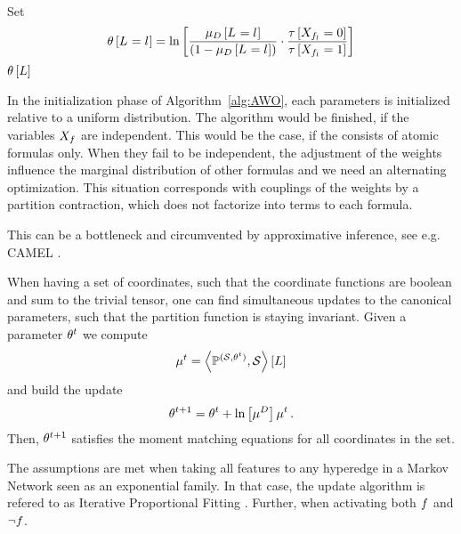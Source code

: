 \begin{algorithm}[hbt!]
\begin{algorithmic}
\begin{align*}
                \end{align*}
                \State Set
                \begin{align*}
                    \theta\left[L_{}=l_{}\right] = \ln \left[ 
                        \frac{\mu_{D}\left[L_{}=l_{}\right]}{(1-\mu_{D}\left[L_{}=l_{}\right])}
                        \cdot \frac{\tau\left[X_{f_{l}}=0\right]}{\tau\left[X_{f_{l}}=1\right]}
                     \right]
                \end{align*}
            \EndFor
        \EndWhile
        \State \Return $\theta\left[L\right]$
    \end{algorithmic}
\end{algorithm}

%


In the initialization phase of Algorithm~\ref{alg:AWO}, each parameters is initialized relative to a uniform distribution.
The algorithm would be finished, if the variables $X_{f}$ are independent.
This would be the case, if the \MarkovLogicNetwork{} consists of atomic formulas only.
When they fail to be independent, the adjustment of the weights influence the marginal distribution of other formulas and we need an alternating optimization.
% 
This situation corresponds with couplings of the weights by a partition contraction, which does not factorize into terms to each formula.


This can be a bottleneck and circumvented by approximative inference, see e.g. CAMEL \cite{ganapathi_constrained_2008}.



\begin{remark}
    When having a set of coordinates, such that the coordinate functions are boolean and sum to the trivial tensor, one can find simultaneous updates to the canonical parameters, such that the partition function is staying invariant.
    Given a parameter $\theta^t$ we compute
    \[ \mu^t = \left\langle \mathbb{P}^{(\mathcal{S},\theta^t)}, \mathcal{S}\right\rangle \left[ L \right] \]
    and build the update
    \[ \theta^{t+1} = \theta^t + \ln \left[ \mu^{D} \right]{\mu^t} \, . \]
    Then, $\theta^{t+1}$ satisfies the moment matching equations for all coordinates in the set.


    The assumptions are met when taking all features to any hyperedge in a Markov Network seen as an exponential family.
    In that case, the update algorithm is refered to as Iterative Proportional Fitting \cite{wainwright_graphical_2008}.
    Further, when activating both $f$ and $\lnot f$.

\end{remark}


